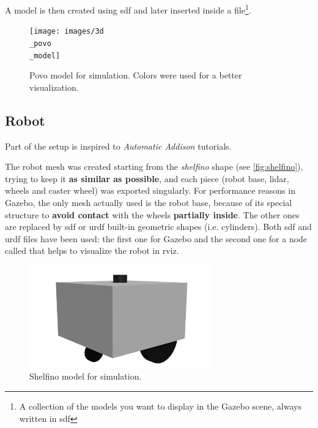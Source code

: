 A model is then created using \acrfull{sdf} and later inserted inside a  file\footnote{A collection of the models you want to display in the Gazebo scene, always written in \acrshort{sdf}}.

\bigskip

\begin{figure}[h]
    \centering
    \texttt{[image: images/3d\\\_povo\\\_model]}
    \caption{Povo model for simulation. Colors were used for a better visualization.}
\end{figure}

\subsection{Robot}
\label{sub:robot}

Part of the setup is inspired to \textit{Automatic Addison} tutorials\cite{tutorials}.

The robot mesh was created starting from the \textit{shelfino} shape (see \autoref{fig:shelfino}), trying to keep it \textbf{as similar as possible}, and each piece (robot base, lidar, wheels and caster wheel) was exported singularly. For performance reasons in Gazebo, the only mesh actually used is the robot base, because of its special structure to \textbf{avoid contact} with the wheels \textbf{partially inside}. The other ones are replaced by \acrshort{sdf} or \acrfull{urdf} built-in geometric shapes (i.e. cylinders).
Both \acrshort{sdf} and \acrshort{urdf} files have been used: the first one for Gazebo and the second one for a node called  that helps to visualize the robot in \acrshort{rviz}.

\begin{figure}[h]
    \centering
    \includegraphics[width=0.7\textwidth]{images/shelfino_3d.png}
    \caption{Shelfino model for simulation.}
\end{figure}

